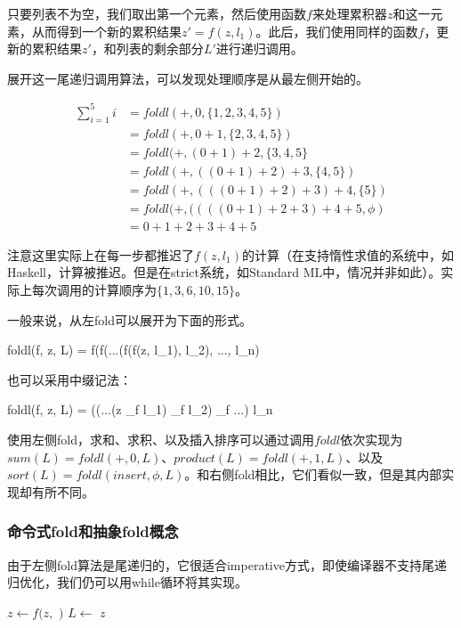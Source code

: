 \documentclass[b5paper]{ctexart}
\begin{document}
只要列表不为空，我们取出第一个元素，然后使用函数$f$来处理累积器$z$和这一元素，从而得到一个新的累积结果$z' = f(z, l_1)$。此后，我们使用同样的函数$f$，更新的累积结果$z'$，和列表的剩余部分$L'$进行递归调用。

展开这一尾递归调用算法，可以发现处理顺序是从最左侧开始的。

\[
\begin{array}{rl}
\sum_{i=1}^{5}i & = foldl(+, 0, \{1, 2, 3, 4, 5\}) \\
                & = foldl(+, 0 + 1, \{ 2, 3, 4, 5 \}) \\
                & = foldl(+, (0 + 1) + 2, \{3, 4, 5 \} \\
                & = foldl(+, ((0 + 1) + 2) + 3, \{4, 5\}) \\
                & = foldl(+, (((0 + 1) + 2) + 3) + 4, \{5\}) \\
                & = foldl(+, ((((0 + 1) + 2 + 3) + 4 + 5, \phi) \\
                & = 0 + 1 + 2 + 3 + 4 + 5
\end{array}
\]

注意这里实际上在每一步都推迟了$f(z, l_1)$的计算（在支持惰性求值的系统中，如Haskell，计算被推迟。但是在strict系统，如Standard ML中，情况并非如此）。实际上每次调用的计算顺序为$\{ 1, 3, 6, 10, 15\}$。

一般来说，从左fold可以展开为下面的形式。

\be
foldl(f, z, L) = f(f(...(f(f(z, l_1), l_2), ..., l_n)
\ee

也可以采用中缀记法：

\be
foldl(f, z, L) = ((...(z \oplus_f l_1) \oplus_f l_2) \oplus_f ...) \oplus l_n
\ee

使用左侧fold，求和、求积、以及插入排序可以通过调用$foldl$依次实现为$sum(L) = foldl(+, 0, L)$、$product(L) = foldl(+, 1, L)$、以及$sort(L) = foldl(insert, \phi, L)$。和右侧fold相比，它们看似一致，但是其内部实现却有所不同。

\subsubsection{命令式fold和抽象fold概念}

由于左侧fold算法是尾递归的，它很适合imperative方式，即使编译器不支持尾递归优化，我们仍可以用while循环将其实现。

\begin{algorithmic}[1]
    \State $z \gets f(z, $  $)$
    \State $L \gets$ 
  \EndWhile
  \State \Return $z$
\EndFunction
\end{algorithmic}
\end{document}
